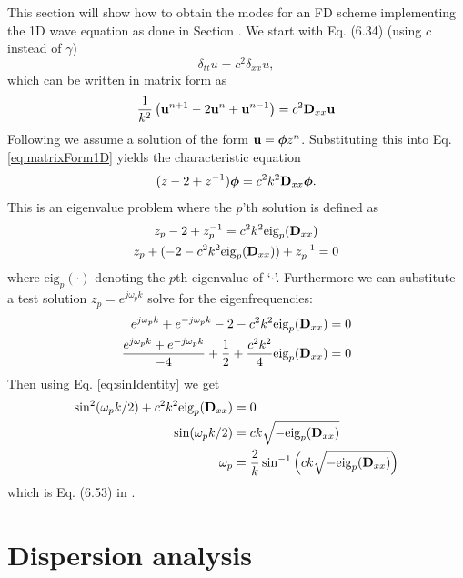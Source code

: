This section will show how to obtain the modes for an FD scheme implementing the 1D wave equation as done in Section . We start with Eq. (6.34) (using $c$ instead of $\gamma$)
\begin{equation}
    \delta_{tt}u = c^2\delta_{xx}u,
\end{equation}
which can be written in matrix form as
\begin{equation}\label{eq:matrixForm1D}
    \frac{1}{k^2}\left(\mathbf{u}^{n+1}-2\mathbf{u}^n+\mathbf{u}^{n-1}\right) = c^2 \mathbf{D}_{xx}\mathbf{u}
\end{equation}
Following \cite{theBible} we assume a solution of the form $\mathbf{u} = \boldsymbol{\phi}z^n$. Substituting this into Eq. \eqref{eq:matrixForm1D} yields the characteristic equation
\begin{equation}
    (z - 2 + z^{-1})\boldsymbol{\phi} = c^2k^2\mathbf{D}_{xx} \boldsymbol{\phi}.
\end{equation}
This is an eigenvalue problem where the $p$'th solution is defined as 
\begin{gather}
    z_p-2+z_p^{-1} = c^2k^2\text{eig}_p(\mathbf{D}_{xx})\nonumber\\
    z_p+(-2-c^2k^2\text{eig}_p(\mathbf{D}_{xx}))+z_p^{-1}=0
\end{gather}
where $\text{eig}_p(\cdot)$ denoting the $p$th eigenvalue of `$\cdot$'.  Furthermore we can substitute a test solution $z_p=e^{j\omega_pk}$ solve for the eigenfrequencies:
\begin{align*}
    e^{j\omega_pk}+e^{-j\omega_pk}-2-c^2k^2\text{eig}_p(\mathbf{D}_{xx})&=0\\
    \frac{e^{j\omega_pk}+e^{-j\omega_pk}}{-4}+\frac{1}{2}+\frac{c^2k^2}{4}\text{eig}_p(\mathbf{D}_{xx})&=0
\end{align*}
Then using Eq. \eqref{eq:sinIdentity} we get
\begin{align}
    \sin^2(\omega_pk/2)+c^2k^2\text{eig}_p(\mathbf{D}_{xx})&=0\nonumber\\
    \sin(\omega_pk/2)&=c k\sqrt{-\text{eig}_p(\mathbf{D}_{xx})}\nonumber\\
    \omega_p &= \frac{2}{k}\sin^{-1}\left(c k\sqrt{-\text{eig}_p(\mathbf{D}_{xx})}\right)
\end{align}
which is Eq. (6.53) in \cite{theBible}.

\section{Dispersion analysis}\label{sec:dispersionAnalysis}
